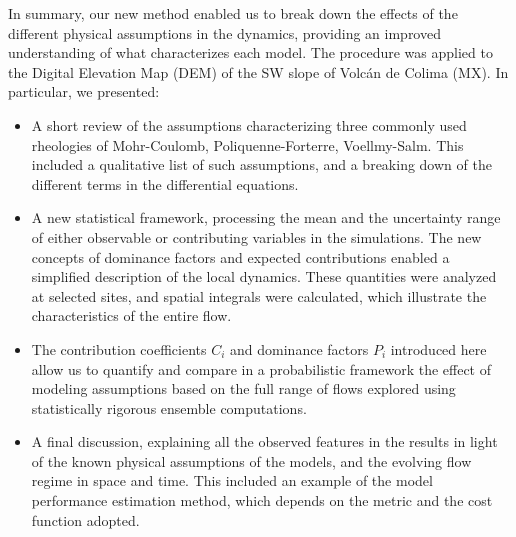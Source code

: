 \documentclass{article}
\begin{document}
In summary, our new method enabled us to break down the effects of the different physical assumptions in the dynamics, providing an improved understanding of what characterizes each model. The procedure was applied to the Digital Elevation Map (DEM) of the SW slope of Volc\'{a}n de Colima (MX). In particular, we presented:
\begin{itemize}
  \item A short review of the assumptions characterizing three commonly used rheologies of Mohr-Coulomb, Poliquenne-Forterre, Voellmy-Salm. This included a qualitative list of such assumptions, and a breaking down of the different terms in the differential equations.
  \item A new statistical framework, processing the mean and the uncertainty range of either observable or contributing variables in the simulations. The new concepts of dominance factors and expected contributions enabled a simplified description of the local dynamics. These quantities were analyzed at selected sites, and spatial integrals were calculated, which illustrate the characteristics of the entire flow.
  \item The contribution  coefficients $C_i$ and dominance factors $P_i$  introduced here allow us to quantify and compare in a probabilistic framework the effect of modeling assumptions based on the full range of flows explored using statistically rigorous ensemble computations.
  \item A final discussion, explaining all the observed features in the results in light of the known physical assumptions of the models, and the evolving flow regime in space and time. This included an example of the model performance estimation method, which depends on the metric and the cost function adopted.
\end{itemize}
\end{document}
